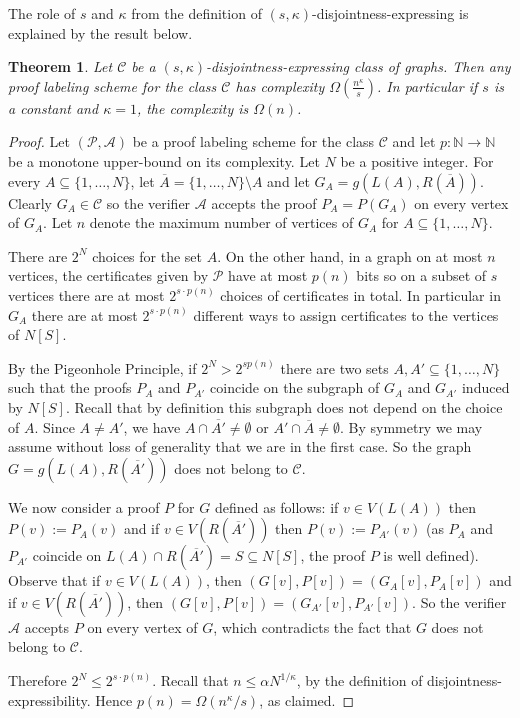 \documentclass[a4paper,reqno, 12pt]{amsart}
\newtheorem{theorem}{Theorem}[section]
\newcommand{\formerepsilon}{\kappa}
\begin{document}
\medskip

The role of $s$ and $\formerepsilon$ from the definition of $(s, \formerepsilon)$-disjointness-expressing
is explained by
the result below.

\begin{theorem}\label{thm:dex}
Let $\mathcal{C}$ be a $(s,\formerepsilon)$-disjointness-expressing class
of graphs. Then any proof labeling scheme for the class $\mathcal{C}$
has complexity $\Omega \left (\frac{n^{\formerepsilon}}{s} \right )$. In particular if
$s$ is a constant and $\formerepsilon=1$, the complexity is $\Omega(n)$.
\end{theorem}


\begin{proof}
  Let $(\mathcal{P}, \mathcal{A})$ be a proof labeling scheme for the
  class $\mathcal{C}$ and let $p\colon \mathbb{N} \to \mathbb{N}$ be a
  monotone upper-bound on its complexity.
%
  Let $N$ be a positive integer. For every $A\subseteq \{1, \ldots,
  N\}$, let $\overline{A} = \{1, \dots, N\} \setminus A$ and let $G_A =
  g(L(A), R(\overline{A}))$.
  Clearly $G_A \in \mathcal{C}$ so the verifier $\mathcal{A}$ accepts
  the proof $P_A = P(G_A)$ on every vertex of $G_A$. Let $n$ denote
  the maximum number of vertices of $G_A$ for $A\subseteq \{1, \ldots,
  N\}$.
  
  There are $2^N$ choices for the set $A$. On the other hand,
  in a graph on at most $n$ vertices, the certificates given by $\mathcal{P}$
  have at most $p(n)$ bits so on a subset of $s$ vertices there are at most
  $2^{s\cdot p(n)}$ choices of certificates in total. In particular in
  $G_A$ there are at most $2^{s\cdot p(n)}$ different ways to assign
  certificates to the vertices of $N[S]$.

  By the Pigeonhole Principle, if $2^N > 2^{sp(n)}$ there are two sets
  $A, A'\subseteq \{1, \dots, N\}$ such that the proofs $P_A$ and $P_{A'}$
  coincide on the subgraph of $G_A$ and $G_{A'}$ induced by
  $N[S]$. Recall that by definition this subgraph does not depend on
  the choice of $A$.
  Since $A\ne A'$, we have $A \cap \overline{A'} \neq \emptyset$ or $A'
  \cap \overline{A} \neq \emptyset$. By symmetry we may assume without loss
  of generality that we are in the first case. So the graph $G =
  g(L(A), R(\overline{A'}))$ does not belong to $\mathcal{C}$.
  
  We now consider
  a proof $P$ for $G$ defined as follows: if $v \in V(L(A))$ then
  $P(v) := P_A(v)$ and if $v \in V(R(\overline{A'}))$ then $P(v) :=
  P_{A'}(v)$ (as $P_A$ and $P_{A'}$ coincide on $L(A)\cap
  R(\overline{A'})=S\subseteq N[S]$, the proof $P$ is well defined).
  Observe that if $v \in V(L(A))$, then $(G[v], P[v]) = (G_A[v],
  P_A[v])$ and  if $v \in V(R(\overline{A'}))$, then $(G[v], P[v]) = (G_{A'}[v], P_{A'}[v])$. So
  the verifier $\mathcal{A}$ accepts $P$ on every vertex of $G$, which
  contradicts the fact that $G$ does not belong to $\mathcal{C}$. 

  Therefore $2^N\leq 2^{s\cdot p(n)}$. Recall that
  $n\leq \alpha N^{1/\formerepsilon}$, by the definition of
  disjointness-expressibility.
  Hence $p(n) = \Omega(n^\formerepsilon/s)$, as claimed.  
\end{proof}
\end{document}

